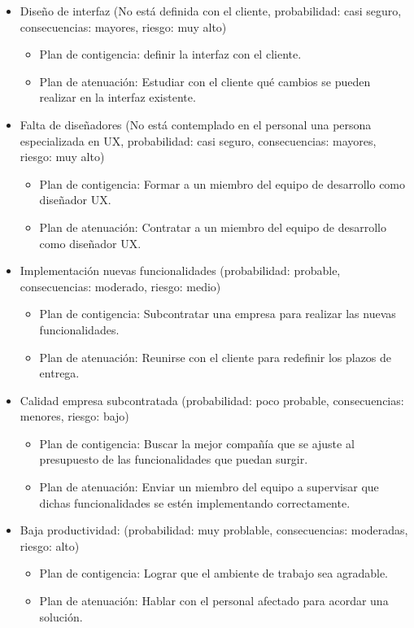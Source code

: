 \documentclass[a4paper,11pt]{report}
\begin{document}
\begin{itemize}
    \item Diseño de interfaz (No está definida con el cliente, probabilidad: casi seguro, consecuencias: mayores, riesgo: muy alto)
    \begin{itemize}
        \item Plan de contigencia: definir la interfaz con el cliente.
        \item Plan de atenuación: Estudiar con el cliente qué cambios se pueden realizar en la interfaz existente.
    \end{itemize}
    
    \item Falta de diseñadores (No está contemplado en el personal una persona especializada en UX, probabilidad: casi seguro, consecuencias: mayores, riesgo: muy alto)
    \begin{itemize}
        \item Plan de contigencia: Formar a un miembro del equipo de desarrollo como diseñador UX.
        \item Plan de atenuación: Contratar a un miembro del equipo de desarrollo como diseñador UX. 
    \end{itemize}

    \item Implementación nuevas funcionalidades (probabilidad: probable, consecuencias: moderado, riesgo: medio)
    \begin{itemize}
        \item Plan de contigencia: Subcontratar una empresa para realizar las nuevas funcionalidades.
        \item Plan de atenuación: Reunirse con el cliente para redefinir los plazos de entrega.
    \end{itemize}

    \item Calidad empresa subcontratada (probabilidad: poco probable, consecuencias: menores, riesgo: bajo)
    \begin{itemize}
        \item Plan de contigencia: Buscar la mejor compañía que se ajuste al presupuesto de las funcionalidades que puedan surgir.
        \item Plan de atenuación: Enviar un miembro del equipo a supervisar que dichas funcionalidades se estén implementando correctamente.
    \end{itemize}

    \item Baja productividad: (probabilidad: muy problable, consecuencias: moderadas, riesgo: alto)
    \begin{itemize}
        \item Plan de contigencia: Lograr que el ambiente de trabajo sea agradable.
        \item Plan de atenuación: Hablar con el personal afectado para acordar una solución.
    \end{itemize}


\end{itemize}
\end{document}
